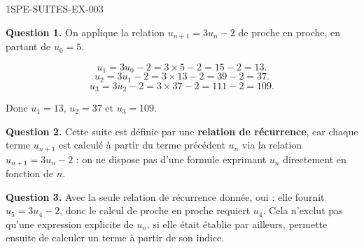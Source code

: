 \begin{corrige}{1SPE-SUITES-EX-003}


\textbf{Question 1.} On applique la relation $u_{n+1} = 3u_n - 2$ de proche en proche, en partant de $u_0 = 5$.

\[
u_1 = 3u_0 - 2 = 3 \times 5 - 2 = 15 - 2 = 13.
\]
\[
u_2 = 3u_1 - 2 = 3 \times 13 - 2 = 39 - 2 = 37.
\]
\[
u_3 = 3u_2 - 2 = 3 \times 37 - 2 = 111 - 2 = 109.
\]

Donc $u_1 = 13$, $u_2 = 37$ et $u_3 = 109$.


\textbf{Question 2.} Cette suite est définie par une \textbf{relation de récurrence}, car chaque terme $u_{n+1}$ est calculé à partir du terme précédent $u_n$ via la relation $u_{n+1} = 3u_n - 2$ : on ne dispose pas d'une formule exprimant $u_n$ directement en fonction de $n$.


\textbf{Question 3.} Avec la seule relation de récurrence donnée, oui : elle fournit
$u_5 = 3u_4 - 2$, donc le calcul de proche en proche requiert $u_4$.
Cela n'exclut pas qu'une expression explicite de $u_n$, si elle était établie par ailleurs,
permette ensuite de calculer un terme à partir de son indice.

\end{corrige}
